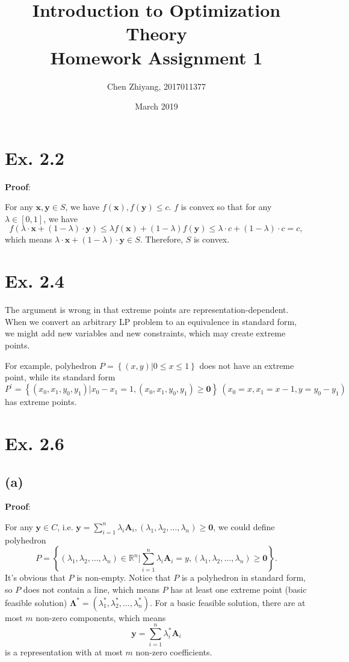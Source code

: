 \documentclass[12pt]{article}
\title{Introduction to Optimization Theory\\Homework Assignment 1}
\author{Chen Zhiyang, 2017011377}
\date{March 2019}
\begin{document}
\maketitle

\section*{Ex. 2.2}
\textbf{Proof}:

For any $\bm{x},\bm{y}\in S$, we have $f(\bm{x}),f(\bm{y}) \le c$. $f$ is convex so that for any $\lambda\in [0,1]$, we have $$f(\lambda\cdot\bm{x}+(1-\lambda)\cdot\bm{y})\le \lambda f(\bm{x})+(1-\lambda)f(\bm{y})\le \lambda\cdot c+(1-\lambda)\cdot c = c,$$ which means $\lambda\cdot \bm{x}+(1-\lambda)\cdot\bm{y}\in S$. Therefore, $S$ is convex.

\section*{Ex. 2.4}
The argument is wrong in that extreme points are representation-dependent. When we convert an arbitrary LP problem to an equivalence in standard form, we might add new variables and new constraints, which may create extreme points.

For example, polyhedron $P=\left\{(x,y)\big|0\le x\le 1\right\}$ does not have an extreme point, while its standard form $P^\prime=\left\{(x_0,x_1,y_0,y_1)\big|x_0-x_1=1,(x_0,x_1,y_0,y_1)\ge \bm{0}\right\}\ (x_0=x,x_1=x-1,y=y_0-y_1)$ has extreme points.

\section*{Ex. 2.6}
\subsection*{(a)}
\textbf{Proof}:

For any $\bm{y}\in C$, i.e. $\bm{y}=\sum_{i=1}^n \lambda_i\bm{A}_i,(\lambda_1,\lambda_2,\ldots,\lambda_n)\ge\bm{0}$, we could define polyhedron $$P=\left\{(\lambda_1,\lambda_2,\ldots,\lambda_n)\in\mathbb{R}^n\Big|\sum_{i=1}^n \lambda_i\bm{A}_i=y,(\lambda_1,\lambda_2,\ldots,\lambda_n)\ge\bm{0}\right\}.$$ It's obvious that $P$ is non-empty. Notice that $P$ is a polyhedron in standard form, so $P$ does not contain a line, which means $P$ has at least one extreme point (basic feasible solution) $\bm{\Lambda}^*=(\lambda_1^*,\lambda_2^*,\ldots,\lambda_n^*)$. For a basic feasible solution, there are at most $m$ non-zero components, which means $$\bm{y}=\sum_{i=1}^n \lambda_i^*\bm{A}_i$$ is a representation with at most $m$ non-zero coefficients.
\end{document}
